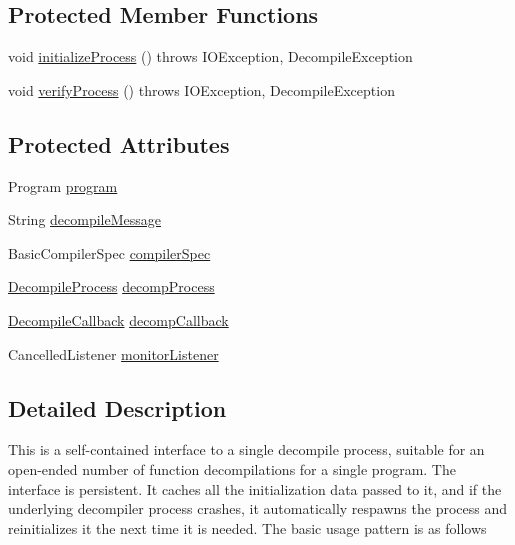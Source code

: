 \subsection*{Protected Member Functions}
\begin{DoxyCompactItemize}
\item 
void \mbox{\hyperlink{classghidra_1_1app_1_1decompiler_1_1_decomp_interface_a6bd1adef30f49c5f74d95619330c2325}{initialize\+Process}} ()  throws I\+O\+Exception, Decompile\+Exception 
\item 
void \mbox{\hyperlink{classghidra_1_1app_1_1decompiler_1_1_decomp_interface_a4c703f5ca2f5e769e5de90d28f2924c8}{verify\+Process}} ()  throws I\+O\+Exception, Decompile\+Exception 
\end{DoxyCompactItemize}
\subsection*{Protected Attributes}
\begin{DoxyCompactItemize}
\item 
Program \mbox{\hyperlink{classghidra_1_1app_1_1decompiler_1_1_decomp_interface_aad6ea388303b2933617b5c3c2e8d825c}{program}}
\item 
String \mbox{\hyperlink{classghidra_1_1app_1_1decompiler_1_1_decomp_interface_a05d30200ccba3276bd75a96ae2c8c3e7}{decompile\+Message}}
\item 
Basic\+Compiler\+Spec \mbox{\hyperlink{classghidra_1_1app_1_1decompiler_1_1_decomp_interface_ad62da6d33351c1ffbe94eb85b979e1b6}{compiler\+Spec}}
\item 
\mbox{\hyperlink{classghidra_1_1app_1_1decompiler_1_1_decompile_process}{Decompile\+Process}} \mbox{\hyperlink{classghidra_1_1app_1_1decompiler_1_1_decomp_interface_a2d91ad57faa15980a1e73bf14d38e761}{decomp\+Process}}
\item 
\mbox{\hyperlink{classghidra_1_1app_1_1decompiler_1_1_decompile_callback}{Decompile\+Callback}} \mbox{\hyperlink{classghidra_1_1app_1_1decompiler_1_1_decomp_interface_a047cb664b03573ad23bbf818b224f1a7}{decomp\+Callback}}
\item 
Cancelled\+Listener \mbox{\hyperlink{classghidra_1_1app_1_1decompiler_1_1_decomp_interface_ab1bc030ce7be45ff1ffd5e8cae5c02bf}{monitor\+Listener}}
\end{DoxyCompactItemize}


\subsection{Detailed Description}
This is a self-\/contained interface to a single decompile process, suitable for an open-\/ended number of function decompilations for a single program. The interface is persistent. It caches all the initialization data passed to it, and if the underlying decompiler process crashes, it automatically respawns the process and reinitializes it the next time it is needed. The basic usage pattern is as follows

